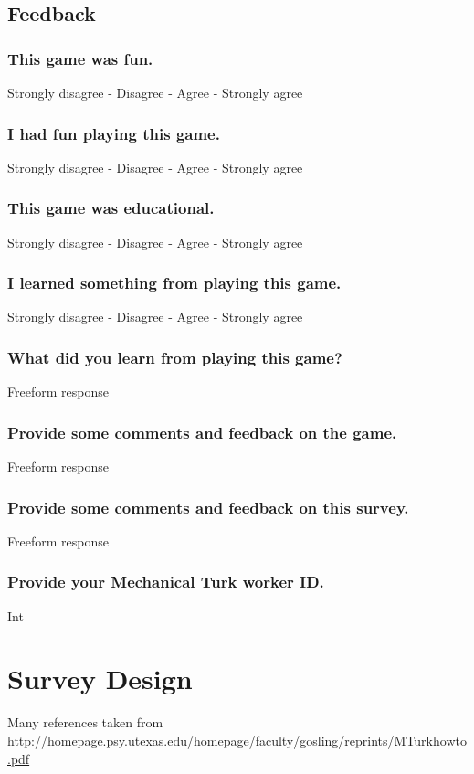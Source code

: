 	\subsection{Feedback}
		\subsubsection{This game was fun.} Strongly disagree - Disagree - Agree - Strongly agree
		\subsubsection{I had fun playing this game.} Strongly disagree - Disagree - Agree - Strongly agree
		\subsubsection{This game was educational.} Strongly disagree - Disagree - Agree - Strongly agree
		\subsubsection{I learned something from playing this game.} Strongly disagree - Disagree - Agree - Strongly agree
		\subsubsection{What did you learn from playing this game?} Freeform response
		\subsubsection{Provide some comments and feedback on the game.} Freeform response
		\subsubsection{Provide some comments and feedback on this survey.} Freeform response
		\subsubsection{Provide your Mechanical Turk worker ID.} Int

		\newpage

		

		\newpage
	
\section{Survey Design}
Many references taken from \url{http://homepage.psy.utexas.edu/homepage/faculty/gosling/reprints/MTurkhowto.pdf}
